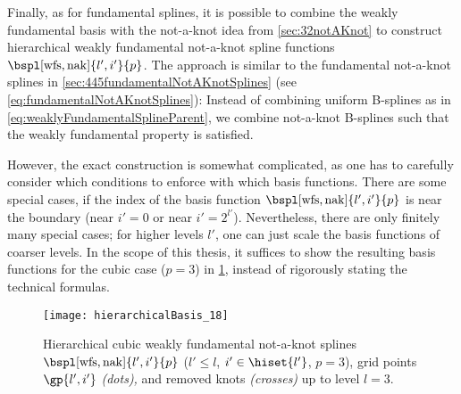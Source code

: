 Finally, as for fundamental splines,
it is possible to combine the weakly fundamental basis
with the not-a-knot idea from \cref{sec:32notAKnot} to construct
hierarchical weakly fundamental not-a-knot spline functions
$\bspl[\wfs,\nak]{l',i'}{p}$.
The approach is similar to the fundamental not-a-knot splines
in \cref{sec:445fundamentalNotAKnotSplines}
(see \cref{eq:fundamentalNotAKnotSplines}):
Instead of combining uniform B-splines as in
\eqref{eq:weaklyFundamentalSplineParent},
we combine not-a-knot B-splines such that the
weakly fundamental property is satisfied.

However, the exact construction is somewhat complicated,
as one has to carefully consider which conditions to enforce
with which basis functions.
There are some special cases, if the index of the basis function
$\bspl[\wfs,\nak]{l',i'}{p}$ is near the boundary
(near $i' = 0$ or near $i' = 2^{l'}$).
Nevertheless, there are only finitely many special cases;
for higher levels $l'$, one can just scale the basis functions
of coarser levels.
In the scope of this thesis,
it suffices to show the resulting basis functions for
the cubic case ($p = 3$) in
\cref{fig:hierarchicalWeaklyFundamentalNotAKnotSpline},
instead of rigorously stating the technical formulas.

\begin{SCfigure}
  \texttt{[image: hierarchicalBasis\_18]}%
  \caption[%
    Hierarchical weakly fundamental not-a-knot splines%
  ]{%
    Hierarchical cubic weakly fundamental not-a-knot splines
    $\bspl[\wfs,\nak]{l',i'}{p}$
    ($l' \le l$, $i' \in \hiset{l'}$, $p = 3$),
    grid points $\gp{l',i'}$ \emph{(dots),} and
    removed knots \emph{(crosses)} up to level $l = 3$.%
  }%
  \label{fig:hierarchicalWeaklyFundamentalNotAKnotSpline}%
\end{SCfigure}
